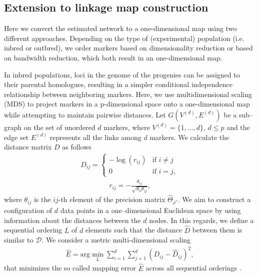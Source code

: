 \subsection{Extension to linkage map construction}
Here we convert the estimated network to a one-dimensional map using two different approaches. Depending on the type of (experimental) population (i.e. inbred or outbred), we order markers based on dimensionality reduction or based on bandwidth reduction, which both result in an one-dimensional map.

In inbred populations, loci in the genome of the progenies can be assigned to their parental homologues, resulting in a simpler conditional independence relationship between neighboring markers. Here, we use multidimensional scaling (MDS) to project markers in a p-dimensional space onto a one-dimensional map while attempting to maintain pairwise distances. Let $G(V^{(d)},E^{(d)})$ be a sub--graph on the set of unordered $d$ markers, where $V^{(d)} = \{1, \ldots, d\}$, $d \leq p$ and the edge set $E^{(d)}$ represents all the links among $d$ markers. We calculate the distance matrix $D$ as follows
\begin{eqnarray}
D_{ij} = \left\{ 
\begin{array}{ll}
- \log (r_{ij}) & \mbox{if $i\ne j$}\\
0  & \mbox{if $i = j$},
\end{array} \right.
\end{eqnarray}
\begin{eqnarray}
r_{ij} = - \frac{\theta_{ij}}{\sqrt{\theta_{ii}\theta_{jj}}},
\end{eqnarray}
where $\theta_{ij}$ is the $ij$-th element of the precision matrix  $\widehat{\Theta}_{\rho^*}$. We aim to construct a configuration of $d$ data points in a one--dimensional Euclidean space by using information about the distances between the $d$ nodes. In this regards, we define a sequential ordering $L$ of $d$ elements such that the distance $\widehat{D}$ between them is similar to $\mathcal{D}$. We consider a metric multi-dimensional scaling
\begin{eqnarray}
\widehat{E}= \mbox{arg}\min_L \sum\limits_{i=1}^{d}\sum\limits_{j=1}^{d}(D_{ij} - \widehat{D}_{ij})^2,
\end{eqnarray}
that minimizes the so called mapping error $\widehat{E}$ across all sequential orderings \citep{sammon1969nonlinear}.

